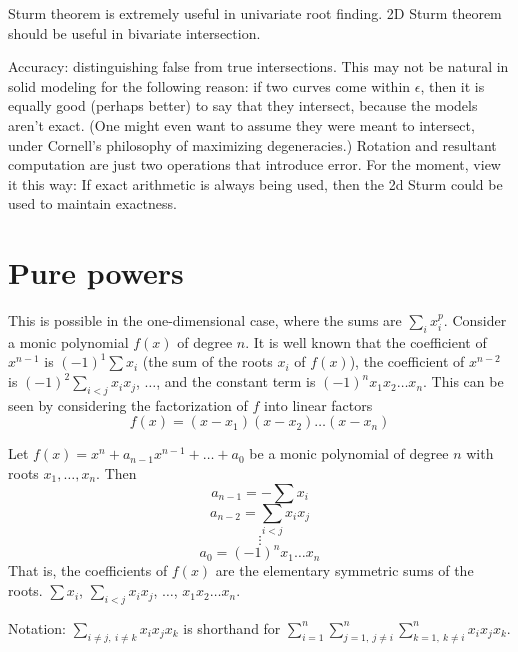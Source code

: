 Sturm theorem is extremely useful in univariate root finding.
2D Sturm theorem should be useful in bivariate intersection.

Accuracy: distinguishing false from true intersections.
This may not be natural in solid modeling for the following reason:
if two curves come within $\epsilon$, then it is equally good (perhaps better)
to say that they intersect, because the models aren't exact.
(One might even want to assume they were meant to intersect, under Cornell's
philosophy of maximizing degeneracies.)
Rotation and resultant computation are just two operations that introduce error.
For the moment, view it this way:
If exact arithmetic is always being used, then the 2d Sturm could be used to 
maintain exactness.


\section{Pure powers}

This is possible in the one-dimensional case,
where the sums are $\sum_{i} x_{i}^{p}$.
Consider a monic polynomial $f(x)$ of degree $n$.
It is well known that the coefficient of $x^{n-1}$ is $(-1)^{1}\sum x_{i}$
(the sum of the roots $x_{i}$ of $f(x)$),
the coefficient of $x^{n-2}$ is $(-1)^{2} \sum_{i < j} x_{i}x_{j}$,
$\ldots$, and the constant term is $(-1)^{n}x_{1}x_{2}\ldots x_{n}$.
This can be seen by considering the factorization of $f$ into linear factors
%
\[ f(x) = (x - x_{1})(x - x_{2})\ldots(x - x_{n}) 
\]
%

\begin{lemma}
Let $f(x) = x^{n} + a_{n-1}x^{n-1} + \ldots + a_{0}$ be a 
monic polynomial of degree $n$ with roots $x_{1}, \ldots, x_{n}$.
Then
\[ a_{n-1} = - \sum x_{i} \]
\[ a_{n-2} =   \sum_{i < j} x_{i}x_{j} \]
\[ \vdots \]
\[ a_{0}   = (-1)^{n} x_{1}\ldots x_{n} \]
That is, the coefficients of $f(x)$ are the elementary symmetric sums of the roots.
$\sum x_{i}$, $\sum_{i < j} x_{i} x_{j}$, $\ldots$, $x_{1}x_{2} \ldots x_{n}$.
\end{lemma}

Notation: $\sum_{i \neq j,\ i \neq k} x_{i}x_{j}x_{k}$ is shorthand for
	  $\sum_{i=1}^{n} \sum_{j=1,\ j \neq i}^{n} \sum_{k=1,\ k \neq i}^{n}
		x_{i}x_{j}x_{k}$.

